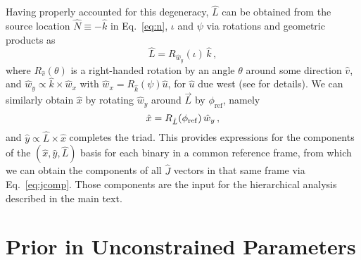 \documentclass[aps,prd,twocolumn,superscriptaddress,preprintnumbers,floatfix,nofootinbib]{revtex4-2}
\begin{document}
Having properly accounted for this degeneracy, $\hat{L}$ can be obtained from the source location $\hat{N} \equiv - \hat{k}$ in Eq.~\eqref{eq:n}, $\iota$ and $\psi$ via rotations and geometric products as
\begin{equation}
\hat{L} = R_{\hat{w}_y}(\iota)\, \hat{k} \, ,
\end{equation}
where $R_{\hat{v}}(\theta)$ is a right-handed rotation by an angle $\theta$ around some direction $\hat{v}$, and $\hat{w}_y \propto \hat{k} \times \hat{w}_x$ with $\hat{w}_x = R_{\hat{k}}(\psi) \hat{u}$, for $\hat{u}$ due west (see \cite{Anderson:T010110} for details).
We can similarly obtain $\hat{x}$ by rotating $\hat{w}_y$ around $\vec{L}$ by $\phi_\mathrm{ref}$, namely
\begin{equation}
\hat{x} = R_{\hat{L}}(\phi_{\rm ref})\, \hat{w}_y \, ,
\end{equation}
and $\hat{y} \propto \hat{L} \times \hat{x}$ completes the triad.
This provides expressions for the components of the $(\hat{x}, \hat{y}, \hat{L})$ basis for each binary in a common reference frame, from which we can obtain the components of all $\hat{J}$ vectors in that same frame via Eq.~\eqref{eq:jcomp}.
Those components are the input for the hierarchical analysis described in the main text.

\section{Prior in Unconstrained Parameters}
\label{app:prior}
\end{document}
